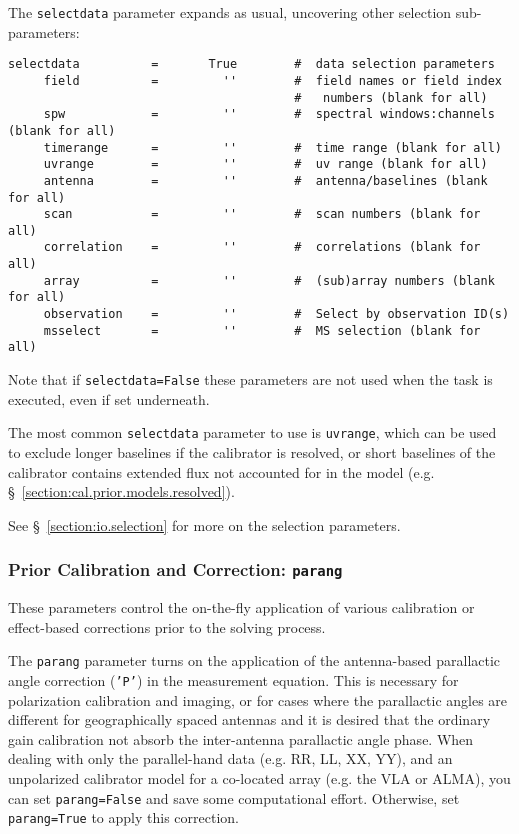 The {\tt selectdata} parameter expands as usual, uncovering other
selection sub-parameters:
\small
\begin{verbatim}
selectdata          =       True        #  data selection parameters
     field          =         ''        #  field names or field index
                                        #   numbers (blank for all)
     spw            =         ''        #  spectral windows:channels (blank for all)
     timerange      =         ''        #  time range (blank for all)
     uvrange        =         ''        #  uv range (blank for all)
     antenna        =         ''        #  antenna/baselines (blank for all)
     scan           =         ''        #  scan numbers (blank for all)
     correlation    =         ''        #  correlations (blank for all)
     array          =         ''        #  (sub)array numbers (blank for all)
     observation    =         ''        #  Select by observation ID(s)
     msselect       =         ''        #  MS selection (blank for all)
\end{verbatim}
\normalsize
Note that if {\tt selectdata=False} these parameters are not used when
the task is executed, even if set underneath.

The most common {\tt selectdata} parameter to use is {\tt uvrange},
which can be used to exclude longer baselines if the calibrator is
resolved, or short baselines of the calibrator contains extended flux
not accounted for in the model 
(e.g. \S~\ref{section:cal.prior.models.resolved}).

See \S~\ref{section:io.selection} for more on the selection parameters.

\subsubsection{Prior Calibration and Correction: {\tt parang} }
\label{section:cal.solve.pars.prior}

These parameters control the on-the-fly application of various
calibration or effect-based corrections prior to the solving process.

The {\tt parang} parameter turns on the application of the
antenna-based parallactic angle correction ({\tt 'P'}) in the
measurement equation.  This is necessary for polarization calibration
and imaging, or for cases where the parallactic angles are different
for geographically spaced antennas and it is desired that the ordinary
gain calibration not absorb the inter-antenna parallactic angle phase.  
When dealing with only the parallel-hand data (e.g. RR, LL, XX, YY),
and an unpolarized calibrator model
for a co-located array (e.g. the VLA or ALMA), you can set {\tt  parang=False} 
and save some computational effort.  Otherwise, set {\tt parang=True} to apply
this correction.

